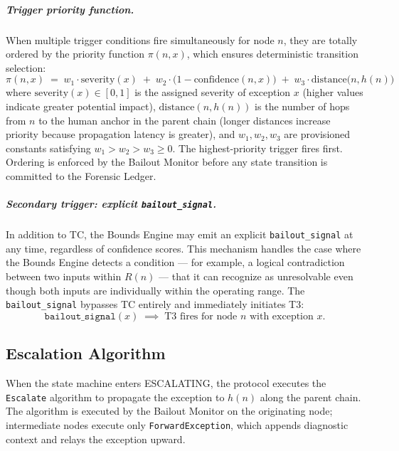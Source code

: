 \subparagraph{Trigger priority function.} When multiple trigger conditions fire simultaneously for node $n$, they are totally ordered by the priority function $\pi(n, x)$, which ensures deterministic transition selection:
\begin{equation}
\pi(n, x) \;=\; w_1 \cdot \text{severity}(x) \;+\; w_2 \cdot \bigl(1 - \text{confidence}(n, x)\bigr) \;+\; w_3 \cdot \text{distance}\bigl(n, h(n)\bigr) \tag{PF}
\end{equation}
where $\text{severity}(x) \in [0, 1]$ is the assigned severity of exception $x$ (higher values indicate greater potential impact), $\text{distance}(n, h(n))$ is the number of hops from $n$ to the human anchor in the parent chain (longer distances increase priority because propagation latency is greater), and $w_1, w_2, w_3$ are provisioned constants satisfying $w_1 > w_2 > w_3 \geq 0$. The highest-priority trigger fires first. Ordering is enforced by the Bailout Monitor before any state transition is committed to the Forensic Ledger.

\subparagraph{Secondary trigger: explicit \texttt{bailout\_signal}.} In addition to TC, the Bounds Engine may emit an explicit \texttt{bailout\_signal} at any time, regardless of confidence scores. This mechanism handles the case where the Bounds Engine detects a condition — for example, a logical contradiction between two inputs within $R(n)$ — that it can recognize as unresolvable even though both inputs are individually within the operating range. The \texttt{bailout\_signal} bypasses TC entirely and immediately initiates T3:
\begin{equation}
\texttt{bailout\_signal}(x) \;\implies\; \text{T3 fires for node } n \text{ with exception } x. \tag{TC-secondary}
\end{equation}

\subsection{Escalation Algorithm}\label{sec:escalation-algorithm}

When the state machine enters ESCALATING, the protocol executes the \texttt{Escalate} algorithm to propagate the exception to $h(n)$ along the parent chain. The algorithm is executed by the Bailout Monitor on the originating node; intermediate nodes execute only \texttt{ForwardException}, which appends diagnostic context and relays the exception upward.

